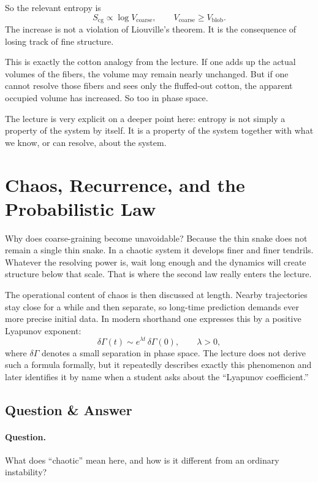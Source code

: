 So the relevant entropy is
\begin{equation}
S_{\mathrm{cg}}\propto \log V_{\mathrm{coarse}},
\qquad
V_{\mathrm{coarse}}\ge V_{\mathrm{blob}}.
\end{equation}
The increase is not a violation of Liouville's theorem. It is the consequence of losing track of fine structure.

This is exactly the cotton analogy from the lecture. If one adds up the actual volumes of the fibers, the volume may remain nearly unchanged. But if one cannot resolve those fibers and sees only the fluffed-out cotton, the apparent occupied volume has increased. So too in phase space.

The lecture is very explicit on a deeper point here: entropy is not simply a property of the system by itself. It is a property of the system together with what we know, or can resolve, about the system.

\section{Chaos, Recurrence, and the Probabilistic Law}

Why does coarse-graining become unavoidable? Because the thin snake does not remain a single thin snake. In a chaotic system it develops finer and finer tendrils. Whatever the resolving power is, wait long enough and the dynamics will create structure below that scale. That is where the second law really enters the lecture.

The operational content of chaos is then discussed at length. Nearby trajectories stay close for a while and then separate, so long-time prediction demands ever more precise initial data. In modern shorthand one expresses this by a positive Lyapunov exponent:
\begin{equation}
\delta\Gamma(t)\sim e^{\lambda t}\,\delta\Gamma(0),
\qquad \lambda>0,
\end{equation}
where \(\delta\Gamma\) denotes a small separation in phase space. The lecture does not derive such a formula formally, but it repeatedly describes exactly this phenomenon and later identifies it by name when a student asks about the ``Lyapunov coefficient.''

\subsection{Question \& Answer}

\paragraph{Question.} What does ``chaotic'' mean here, and how is it different from an ordinary instability?

